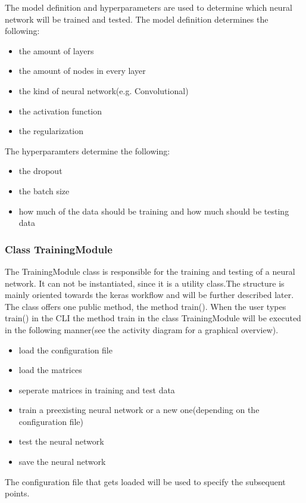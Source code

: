 \documentclass[parskip=full]{scrartcl}
\begin{document}
The model definition and hyperparameters are used to determine which neural network will be trained and tested. The model definition determines the following:
\begin{itemize}
\item the amount of layers
\item the amount of nodes in every layer
\item the kind of neural network(e.g. Convolutional)
\item the activation function
\item the regularization
\end{itemize}

The hyperparamters determine the following:

\begin{itemize}
\item the dropout
\item the batch size
\item how much of the data should be training and how much should be testing data
\end{itemize}

\subsubsection{Class TrainingModule}
The TrainingModule class is responsible for the training and testing of a neural network.
It can not be instantiated, since it is a utility class.The structure is mainly oriented towards the keras workflow and will be further described later.
The class offers one public method, the method train(). \newline
When the user types train() in the CLI the method train in the class TrainingModule will be executed in the following manner(see the activity diagram for a graphical overview).

\begin{itemize}
\item load the configuration file
\item load the matrices
\item seperate matrices in training and test data
\item train a preexisting neural network or a new one(depending on the configuration file)
\item test the neural network
\item save the neural network
\end{itemize}

The configuration file that gets loaded will be used to specify the subsequent points.\newline
\end{document}
